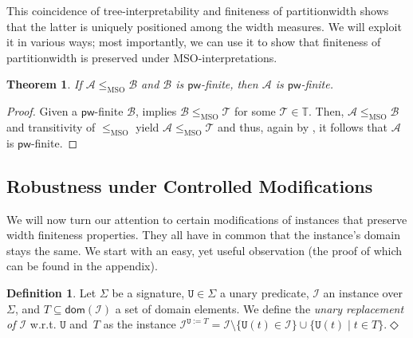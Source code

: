 \documentclass[10pt,a4paper]{amsart}
\theoremstyle{definition}
\numberwithin{equation}{section}
\theoremstyle{plain}
\newtheorem{theorem}[theorem]{Theorem}
\theoremstyle{definition}
\newtheorem{definition}[definition]{Definition}
\theoremstyle{myexample}
\theoremstyle{plain}
\theoremstyle{definition}
\newcommand{\signature}{\Sigma}
\newcommand{\instance}{\mathcal{I}}
\newcommand{\inst}{\instance}
\newcommand{\adom}[1]{\fcn{dom}(#1)}
\newcommand{\fcn}[1]{\mathsf{#1}}
\newcommand{\pred}[1]{\mathtt{#1}}
\newcommand{\defend}{\hfill\ensuremath{\Diamond}}
\begin{document}
This coincidence of tree-interpretability and finiteness of par\-ti\-tion\-width shows that the latter is uniquely positioned among the width measures. We will exploit it in various ways; 
%
%
most importantly, we can use it to show that finiteness of partitionwidth is preserved under MSO-in\-ter\-pre\-tations.

\begin{theorem}
If $\mathcal{A} \leq_{\text{MSO}} \mathcal{B}$ and $\mathcal{B}$ is $\fcn{pw}$-finite, then $\mathcal{A}$ is $\fcn{pw}$-finite.
\end{theorem}
\begin{proof}
Given a $\fcn{pw}$-finite $\mathcal{B}$,  implies  $\mathcal{B} \leq_{\text{MSO}} \mathcal{T}$ for some $\mathcal{T}\in\mathbb{T}$.
Then, $\mathcal{A} \leq_{\text{MSO}} \mathcal{B}$ and transitivity of $\leq_{\text{MSO}}$ yield $\mathcal{A} \leq_{\text{MSO}} \mathcal{T}$ and thus, again by , it follows that $\mathcal{A}$ is $\fcn{pw}$-finite.
\end{proof}

\subsection{Robustness under Controlled Modifications}\label{sec:preservation}

We will now turn our attention to certain modifications of instances that preserve width finiteness properties. They all have in common that the instance's domain stays the same. We start with an easy, yet useful observation (the proof of which can be found in the appendix).

\begin{definition}
Let $\signature$ be a signature, $\pred{U} \in \signature$ a unary predicate, $\inst$ an instance over $\signature$, and $T \subseteq \adom{\inst}$ a set of domain ele\-ments.
We define the \emph{unary replacement of $\inst$} w.r.t. $\pred{U}$ and~$T$ as the instance $\inst^{\pred{U}:=T} = \inst \setminus \{\pred{U}(t) \in \inst\} \cup \{\pred{U}(t) \mid t \in T \}$.\defend
\end{definition} 
\end{document}

